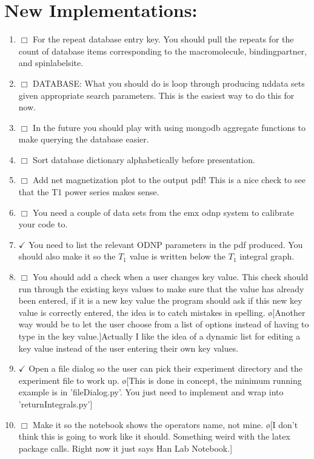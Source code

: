 \documentclass[10pt]{book}
\begin{document}
\section{New Implementations:}
\begin{enumerate}
    \item $\Box$ For the repeat database entry key. You should pull the repeats for the count of database items corresponding to the macromolecule, bindingpartner, and spinlabelsite.
    \item $\Box$ DATABASE: What you should do is loop through producing nddata sets given appropriate search parameters. This is the easiest way to do this for now. 
    \item $\Box$ In the future you should play with using mongodb aggregate functions to make querying the database easier.
    \item $\Box$ Sort database dictionary alphabetically before presentation.
    \item $\Box$ Add net magnetization plot to the output pdf! This is a nice check to see that the T1 power series makes sense.
    \item $\Box$ You need a couple of data sets from the emx odnp system to calibrate your code to.
    \item $\checkmark$ You need to list the relevant ODNP parameters in the pdf produced. You should also make it so the $T_1$ value is written below the $T_1$ integral graph.
    \item $\Box$ You should add a check when a user changes key value. This check should run through the existing keys values to make sure that the value has already been entered, if it is a new key value the program should ask if this new key value is correctly entered, the idea is to catch mistakes in spelling. \o[Another way would be to let the user choose from a list of options instead of having to type in the key value.]{Actually I like the idea of a dynamic list for editing a key value instead of the user entering their own key values.}
    \item $\checkmark$ Open a file dialog so the user can pick their experiment directory and the experiment file to work up. \o[This is done in concept, the minimum running example is in 'fileDialog.py'. You just need to implement and wrap into 'returnIntegrals.py']{}
    \item $\Box$ Make it so the notebook shows the operators name, not mine. \o[I don't think this is going to work like it should. Something weird with the latex package calls. Right now it just says Han Lab Notebook.]{}

\end{enumerate}
\end{document}
